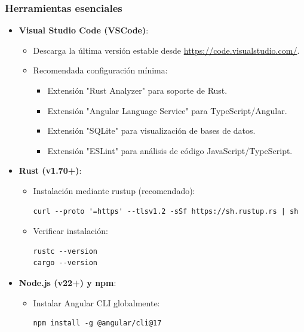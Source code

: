 \documentclass[11pt, a4paper]{article}
\begin{document}
    \subsubsection{Herramientas esenciales}

    \begin{itemize}
      \item \textbf{Visual Studio Code (VSCode)}:
      \begin{itemize}
        \item Descarga la última versión estable desde \url{https://code.visualstudio.com/}.
        \item Recomendada configuración mínima:
        \begin{itemize}
          \item Extensión "Rust Analyzer" para soporte de Rust.
          \item Extensión "Angular Language Service" para TypeScript/Angular.
          \item Extensión "SQLite" para visualización de bases de datos.
          \item Extensión "ESLint" para análisis de código JavaScript/TypeScript.
          \end{itemize}
        \end{itemize} \newpage
        
        \item \textbf{Rust (v1.70+)}:
          \begin{itemize}
            \item Instalación mediante rustup (recomendado):
              \begin{lstlisting}[caption={Instala Rust}]
curl --proto '=https' --tlsv1.2 -sSf https://sh.rustup.rs | sh
              \end{lstlisting}
            \item Verificar instalación:
              \begin{lstlisting}
rustc --version
cargo --version
              \end{lstlisting}
        \end{itemize}
        
        \item \textbf{Node.js (v22+) y npm}:
        \begin{itemize}
          \item Instalar Angular CLI globalmente:
          \begin{lstlisting}[caption={Instalar Angular}]
npm install -g @angular/cli@17
          \end{lstlisting}
        \end{itemize}
    \end{itemize}
\end{document}

